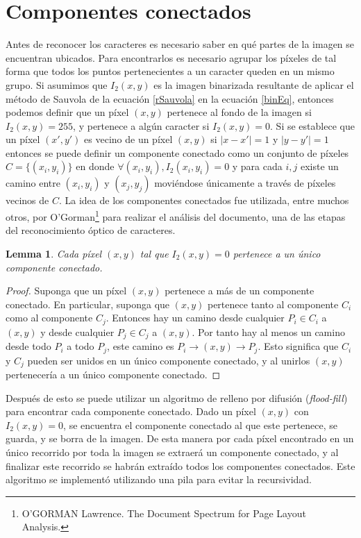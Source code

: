 \documentclass[a4paper, 11pt, oneside]{report}
\begin{document}
\section{Componentes conectados}
\label{sect:conComponents}

Antes de reconocer los caracteres es necesario saber en qué partes de la imagen se encuentran ubicados. Para encontrarlos es necesario agrupar los píxeles de tal forma que todos los puntos pertenecientes a un caracter queden en un mismo grupo. Si asumimos que $I_2(x,y)$ es la imagen binarizada resultante de aplicar el método de Sauvola de la ecuación \eqref{rSauvola} en la ecuación \eqref{binEq}, entonces podemos definir que un píxel $(x,y)$ pertenece al fondo de la imagen si $I_2(x,y)=255$, y pertenece a algún caracter si $I_2(x,y)=0$. Si se establece que un píxel $(x',y')$ es vecino de un píxel $(x,y)$ si $|x-x'|=1$ y $|y-y'|=1$ entonces se puede definir un componente conectado como un conjunto de píxeles $C=\{(x_i,y_i)\}$ en donde $\forall{(x_i,y_i)}, I_2(x_i,y_i)=0$ y para cada $i,j$ existe un camino entre $(x_i,y_i)$ y $(x_j,y_j)$ moviéndose únicamente a través de píxeles vecinos de $C$. La idea de los componentes conectados fue utilizada, entre muchos otros, por O'Gorman\footnote{O’GORMAN Lawrence. The Document Spectrum for Page Layout Analysis.} para realizar el análisis del documento, una de las etapas del reconocimiento óptico de caracteres.

\newtheorem{pixHasOneC}{Lemma}
\begin{pixHasOneC}
	Cada píxel $(x,y)$ tal que $I_2(x,y)=0$ pertenece a un único componente conectado.
\end{pixHasOneC}
\begin{proof}
	Suponga que un píxel $(x,y)$ pertenece a más de un componente conectado. En particular, suponga que $(x,y)$ pertenece tanto al componente $C_i$ como al componente $C_j$. Entonces hay un camino desde cualquier $P_i \in C_i$ a $(x,y)$ y desde cualquier $P_j \in C_j$ a $(x,y)$. Por tanto hay al menos un camino desde todo $P_i$ a todo $P_j$, este camino es $P_i \rightarrow (x,y) \rightarrow P_j$. Esto significa que $C_i$ y $C_j$ pueden ser unidos en un único componente conectado, y al unirlos $(x,y)$ pertenecería a un único componente conectado.
\end{proof}

Después de esto se puede utilizar un algoritmo de relleno por difusión ({\em flood-fill}) para encontrar cada componente conectado. Dado un píxel $(x,y)$ con $I_2(x,y)=0$, se encuentra el componente conectado al que este pertenece, se guarda, y se borra de la imagen. De esta manera por cada píxel encontrado en un único recorrido por toda la imagen se extraerá un componente conectado, y al finalizar este recorrido se habrán extraído todos los componentes conectados. Este algoritmo se implementó utilizando una pila para evitar la recursividad.
\end{document}
